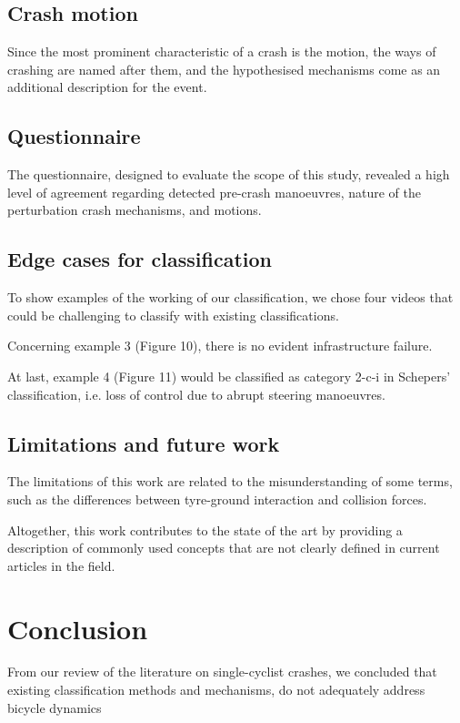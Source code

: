 \documentclass{article}
\begin{document}
\subsection{Crash motion}

Since the most prominent characteristic of a crash is the motion, the ways of crashing are named after them, and the hypothesised mechanisms come as an additional description for the event.

\subsection{Questionnaire}

The questionnaire, designed to evaluate the scope of this study, revealed a high level of agreement regarding detected pre-crash manoeuvres, nature of the perturbation crash mechanisms, and motions.

\subsection{Edge cases for classification}

To show examples of the working of our classification, we chose four videos that could be challenging to classify with existing classifications.

Concerning example 3 (Figure 10), there is no evident infrastructure failure. 

At last, example 4 (Figure 11) would be classified as category 2-c-i in Schepers’ classification, i.e. loss of control due to abrupt steering manoeuvres.

\subsection{Limitations and future work}

The limitations of this work are related to the misunderstanding of some terms, such as the differences between tyre-ground interaction and collision forces. 

Altogether, this work contributes to the state of the art by providing a description of commonly used concepts that are not clearly defined in current articles in the field. 

\section{Conclusion}

From our review of the literature on single-cyclist crashes, we concluded that existing classification methods and mechanisms, do not adequately address bicycle dynamics
\end{document}
